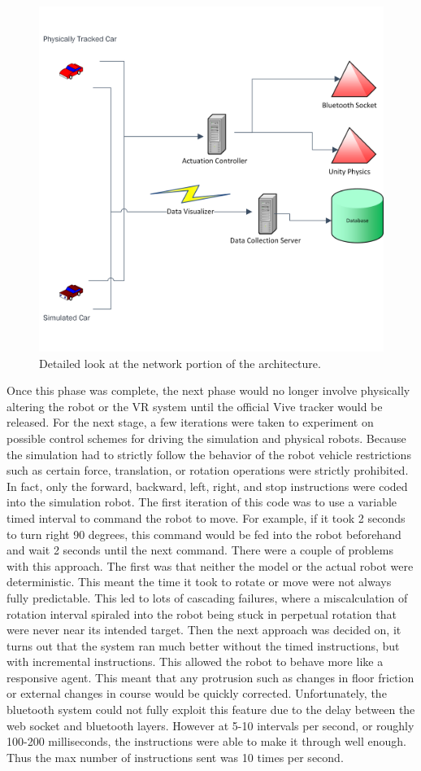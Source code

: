 \documentclass[10pt,a4paper]{article}
\begin{document}
	\begin{figure}
	\centering
	\includegraphics[width=.6\textwidth]{Network_pipline.png}
	\caption{Detailed look at the network portion of the architecture.}
	\label{fig:network-pipe}
	\end{figure}

	Once this phase was complete, the next phase would no longer involve physically altering the robot or the VR system until the official Vive tracker would be released. For the next stage, a few iterations were taken to experiment on possible control schemes for driving the simulation and physical robots. Because the simulation had to strictly follow the behavior of the robot vehicle restrictions such as certain force, translation, or rotation operations were strictly prohibited. In fact, only the forward, backward, left, right, and stop instructions were coded into the simulation robot. The first iteration of this code was to use a variable timed interval to command the robot to move. For example, if it took 2 seconds to turn right 90 degrees, this command would be fed into the robot beforehand and wait 2 seconds until the next command. There were a couple of problems with this approach. The first was that neither the model or the actual robot were deterministic. This meant the time it took to rotate or move were not always fully predictable. This led to lots of cascading failures, where a miscalculation of rotation interval spiraled into the robot being stuck in perpetual rotation that were never near its intended target. Then the next approach was decided on, it turns out that the system ran much better without the timed instructions, but with incremental instructions. This allowed the robot to behave more like a responsive agent. This meant that any protrusion such as changes in floor friction or external changes in course would be quickly corrected. Unfortunately, the bluetooth system could not fully exploit this feature due to the delay between the web socket and bluetooth layers. However at 5-10 intervals per second, or roughly 100-200 milliseconds, the instructions were able to make it through well enough. Thus the max number of instructions sent was 10 times per second.
	
\end{document}
